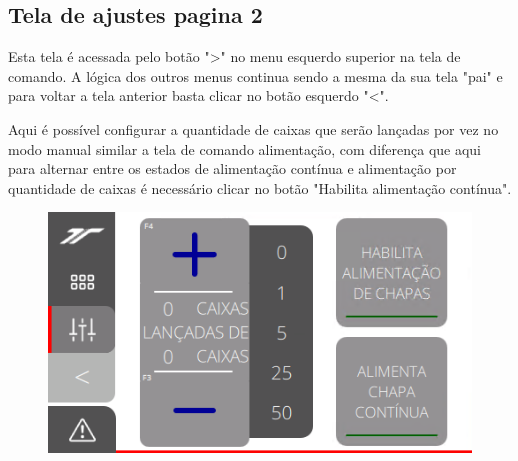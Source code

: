 \subsection{Tela de ajustes pagina 2}\label{telaAjustes2}
Esta tela é acessada pelo botão "\textgreater" no menu esquerdo superior na tela de comando. A lógica dos outros menus continua sendo a mesma da sua tela "pai" e para voltar a tela anterior basta clicar no botão esquerdo "\textless{}".

Aqui é possível configurar a quantidade de caixas que serão lançadas por vez no modo manual similar a tela de comando alimentação, com diferença que aqui
 para alternar entre os estados de alimentação contínua e alimentação por quantidade de caixas é necessário clicar no botão "Habilita alimentação contínua".
\vspace*{\fill}
\begin{figure}[h]
  \centering
  \includegraphics{src/imagesFlexo/11-IHMALM/e-5.png}
\end{figure}
\vspace*{\fill}